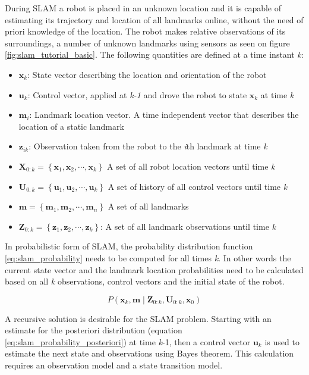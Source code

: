During SLAM a robot is placed in an unknown location and it is capable of estimating its trajectory and 
location of all landmarks online, without the need of priori knowledge of the location. The robot makes relative
observations of its surroundings, a number of unknown landmarks using sensors as seen on figure \ref{fig:slam_tutorial_basic}.
The following quantities are defined at a time instant \emph{k}:
\begin{itemize}
	\item $\mathbf{x}_{k}$: State vector describing the location and orientation of the robot
	\item $\mathbf{u}_{k}$: Control vector, applied at \emph{k-1} and drove the robot to state $\mathbf{x}_{k}$ at time \emph{k}
	\item $\mathbf{m}_i$: Landmark location vector. A time independent vector that describes the location of a static landmark
	\item $\mathbf{z}_{ik}$: Observation taken from the robot to the \emph{i}th landmark at time \emph{k}
	\item $\mathbf{X}_{0:k}=\left \{ \mathbf{x}_1,\mathbf{x}_2,\cdots,\mathbf{x}_k \right \}$ A set of all robot location vectors until time \emph{k}
	\item $\mathbf{U}_{0:k}=\left \{ \mathbf{u}_1,\mathbf{u}_2,\cdots,\mathbf{u}_k \right \}$ A set of history of all control vectors until time \emph{k}
	\item $\mathbf{m}=\left \{ \mathbf{m}_1,\mathbf{m}_2,\cdots,\mathbf{m}_n \right \}$ A set of all landmarks
	\item $\mathbf{Z}_{0:k}=\left \{ \mathbf{z}_1,\mathbf{z}_2,\cdots,\mathbf{z}_k \right \}$: A set of all landmark observations until time \emph{k}
\end{itemize}

In probabilistic form of SLAM, the probability distribution function \ref{eq:slam_probability} needs to be computed for
all times \emph{k}. In other words the current state vector and the landmark location probabilities need to be calculated
based on all \emph{k} observations, control vectors and the initial state of the robot.

\begin{equation} \label{eq:slam_probability}
    P\left ( \mathbf{x}_{k},\mathbf{m}\mid \mathbf{Z}_{0:k},\mathbf{U}_{0:k},\mathbf{x}_{0}\right )
\end{equation}

A recursive solution is desirable for the SLAM problem. Starting with an estimate for the posteriori distribution 
(equation \ref{eq:slam_probability_posteriori}) at time \emph{k}-1, then a control vector $\mathbf{u}_{k}$ is used to
estimate the next state and observations using Bayes theorem. This calculation requires an observation model and a 
state transition model.
 


